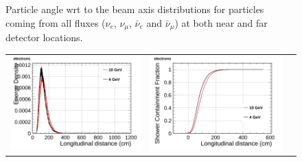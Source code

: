 \begin{figure}[h!]
  \centering
\label{fig:particle_theta}
  \caption{Particle angle wrt to the beam axis distributions for particles coming from all fluxes ($\nu_e$, $\nu_\mu$, $\bar \nu_e$ and $\bar \nu_\mu$) at both near and far detector locations.  }
\end{figure}

\newpage


\begin{figure}[htp]
  \centering
  \label{fig:containment}
  
  \begin{tabular}{ccc}
    \includegraphics[scale=0.15]{figures/electrons_density_overlay}&
    \includegraphics[scale=0.15]{figures/electrons_lcont_overlay}&

\end{tabular}
\end{figure}
